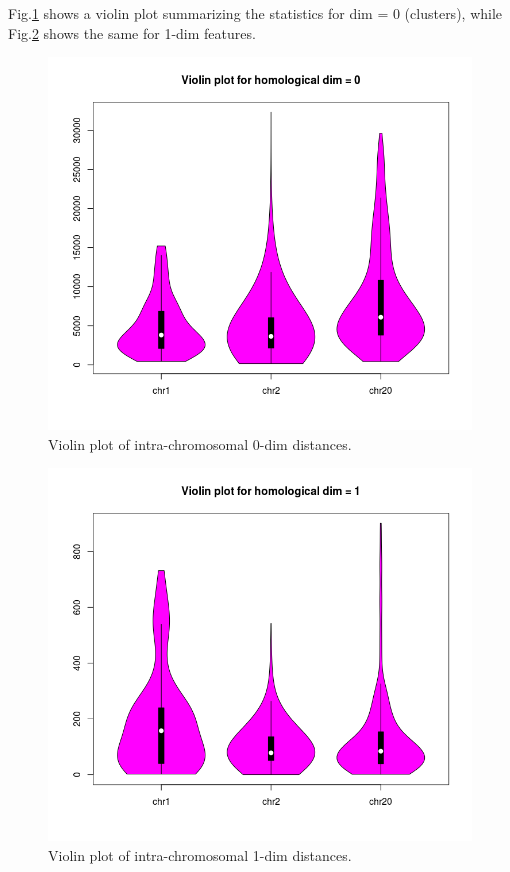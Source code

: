 \documentclass[12pt,a4paper]{article}
\begin{document}
Fig.\ref{fig:vio_d0_intra} shows a violin plot summarizing the statistics for dim = 0 (clusters), 
while Fig.\ref{fig:vio_d1_intra} shows the same for 1-dim features.
\begin{figure}[hbtp]
\centering
\includegraphics[scale=0.75]{violin_plot_dim0.png}
\caption{Violin plot of intra-chromosomal 0-dim distances.}
\label{fig:vio_d0_intra}
\end{figure}

\begin{figure}[hbtp]
\centering
\includegraphics[scale=0.75]{violin_plot_dim1.png}
\caption{Violin plot of intra-chromosomal 1-dim distances.}
\label{fig:vio_d1_intra}
\end{figure}
\end{document}
